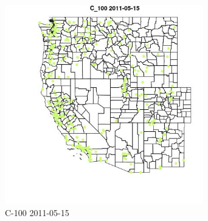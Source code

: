 \begin{figure} 
\centering  
\includegraphics[width=0.77\textwidth]{Code_Outputs/ML_input_report_ML_input_PM25_Step5_part_d_de_duplicated_aves_ML_input_MapObsC_1002011-05-15.jpg} 
\caption{\label{fig:ML_input_report_ML_input_PM25_Step5_part_d_de_duplicated_aves_ML_inputMapObsC_1002011-05-15}C-100 2011-05-15} 
\end{figure} 
 

